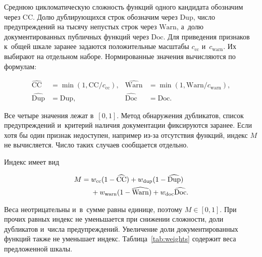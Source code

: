 Среднюю цикломатическую сложность функций одного кандидата обозначим через $\mathrm{CC}$. Долю дублирующихся строк обозначим через $\mathrm{Dup}$, число предупреждений на тысячу непустых строк через $\mathrm{Warn}$, а~долю документированных публичных функций через $\mathrm{Doc}$. Для приведения признаков к~общей шкале заранее задаются положительные масштабы $c_{\mathrm{cc}}$ и~$c_{\mathrm{warn}}$. Их выбирают на отдельном наборе. Нормированные значения вычисляются по формулам:
\begin{formulakey}
\begin{align}
\widehat{\mathrm{CC}}&=\min(1,\mathrm{CC}/c_{\mathrm{cc}}), &
\widehat{\mathrm{Warn}}&=\min(1,\mathrm{Warn}/c_{\mathrm{warn}}),\\
\widehat{\mathrm{Dup}}&=\mathrm{Dup}, &
\widehat{\mathrm{Doc}}&=\mathrm{Doc}.
\end{align}
\begin{symbols}
\end{symbols}
\end{formulakey}
Все четыре значения лежат в~$[0,1]$. Метод обнаружения дубликатов, список предупреждений и~критерий наличия документации фиксируются заранее. Если хотя бы один признак недоступен, например из-за отсутствия функций, индекс $M$ не вычисляется. Число таких случаев сообщается отдельно.

Индекс имеет вид
\begin{formulakey}
\begin{align}
M={}&w_{\mathrm{cc}}(1-\widehat{\mathrm{CC}})
+w_{\mathrm{dup}}(1-\widehat{\mathrm{Dup}})\notag\\
&+w_{\mathrm{warn}}(1-\widehat{\mathrm{Warn}})
+w_{\mathrm{doc}}\widehat{\mathrm{Doc}}.
\label{eq:maintainability}
\end{align}
\begin{symbols}
\end{symbols}
\end{formulakey}
Веса неотрицательны и~в~сумме равны единице, поэтому $M\in[0,1]$. При прочих равных индекс не уменьшается при снижении сложности, доли дубликатов и~числа предупреждений. Увеличение доли документированных функций также не уменьшает индекс. Таблица~\ref{tab:weights} содержит веса предложенной шкалы.

